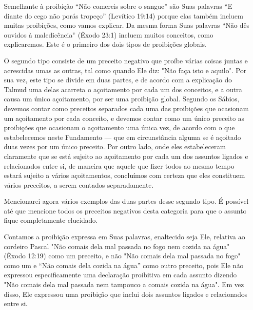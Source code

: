  
 
 
 
 
 

Semelhante à proibição ``Não comereis sobre o sangue'' são Suas pa­lavras
``E diante do cego não porás tropeço'' (Levítico 19:14) porque elas
tam­bém incluem muitas proibições, como vamos explicar. Da mesma forma
Suas palavras ``Não dês ouvidos à maledicência'' (Êxodo 23:1) incluem
muitos con­ceitos, como explicaremos. Este é o primeiro dos dois tipos
de proibições globais.

O segundo tipo consiste de um preceito negativo que proíbe várias coisas
juntas e acrescidas umas as outras, tal como quando Ele diz: "Não faça
isto e aquilo". Por sua vez, este tipo se divide em duas partes, e de
acordo com a explicação do Talmud uma delas acarreta o açoitamento por
cada um dos con­ceitos, e a outra causa um único açoitamento, por ser
uma proibição global. Segundo os Sábios, devemos contar como preceitos
separados cada uma das proibições que ocasionam um açoitamento por cada
conceito, e devemos con­tar como um único preceito as proibições que
ocasionam o açoitamento uma única vez, de acordo com o que estabelecemos
neste Fundamento --- que em circunstância alguma se é açoitado duas
vezes por um único preceito. Por ou­tro lado, onde eles estabeleceram
claramente que se está sujeito ao açoitamen­to por cada um dos assuntos
ligados e relacionados entre si, de maneira que aquele que fizer todos
ao mesmo tempo estará sujeito a vários açoitamentos, concluímos com
certeza que eles constituem vários preceitos, a serem conta­dos
separadamente.

Mencionarei agora vários exemplos das duas partes desse segundo tipo. É
possível até que mencione todos os preceitos negativos desta categoria
para que o assunto fique completamente elucidado.

Contamos a proibição expressa em Suas palavras, enaltecido seja Ele,
relativa ao cordeiro Pascal "Não comais dela mal passada no fogo nem
cozida na água" (Êxodo 12:19) como um preceito, e não "Não comais dela
mal passa­da no fogo" como um e ``Não comais dela cozida na água'' como
outro precei­to, pois Ele não expressou especificamente uma declaração
proibitiva em cada assunto dizendo "Não comais dela mal passada nem
tampouco a comais cozida na água". Em vez disso, Ele expressou uma
proibição que inclui dois assuntos ligados e relacionados entre si.

